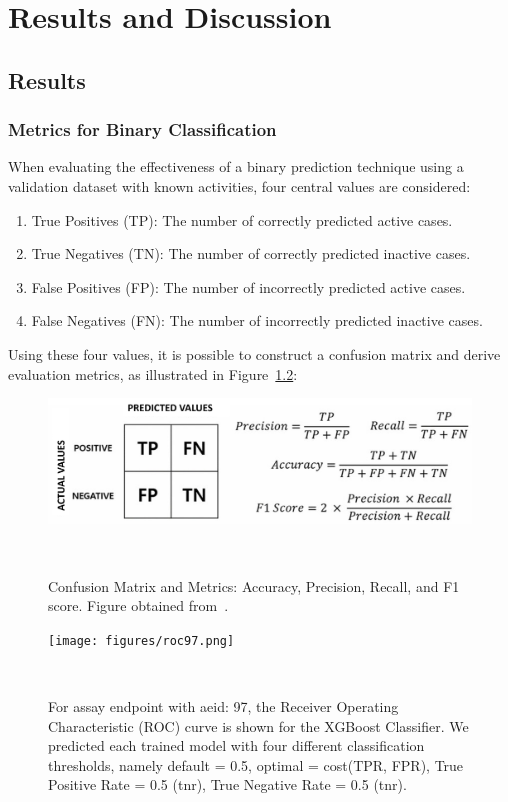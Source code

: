 \chapter{Results and Discussion}\label{chap:results_discussion}
\section{Results}\label{sec:results}
\subsection{Metrics for Binary Classification}\label{sec:confusion_matrix}
When evaluating the effectiveness of a binary prediction technique using a validation dataset with known activities, four central values are considered:

\begin{enumerate}
  \item True Positives (TP): The number of correctly predicted active cases.
  \item True Negatives (TN): The number of correctly predicted inactive cases.
  \item False Positives (FP): The number of incorrectly predicted active cases.
  \item False Negatives (FN): The number of incorrectly predicted inactive cases.
\end{enumerate}

Using these four values, it is possible to construct a confusion matrix and derive evaluation metrics, as illustrated in Figure~\ref{fig:confusion_matrix}:

\begin{figure} 
  \centering
  \includegraphics[width=1.0\textwidth]{figures/confusion_matrix_metrics.png}
  \caption{Confusion Matrix and Metrics: Accuracy, Precision, Recall, and F1 score.
  Figure obtained from~\cite{seol2023}.}
~\label{fig:confusion_matrix}
\end{figure}

\begin{figure} 
  \centering
  \texttt{[image: figures/roc97.png]}
  \caption{For assay endpoint with aeid: 97, the Receiver Operating Characteristic (ROC) curve is shown for the XGBoost Classifier. We predicted each trained model with four different classification thresholds, namely default = 0.5, optimal = cost(TPR, FPR), True Positive Rate = 0.5 (tnr), True Negative Rate = 0.5 (tnr).}
~\label{fig:confusion_matrix}
\end{figure}


